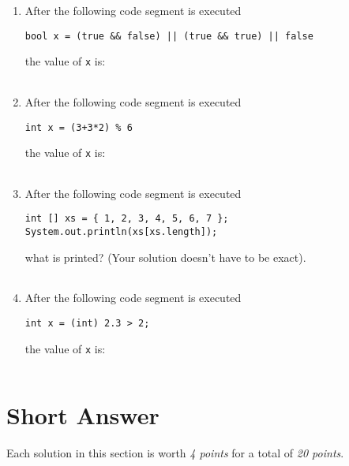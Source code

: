 \documentclass[12pt]{report}
\newcommand{\Ans}{\hfill {\Huge\begin{tabular}{|c|} \hline \hspace{2.5cm} \hfill \\ \hline \end{tabular}} }
\begin{document}
\begin{enumerate}
\item After the following code segment is executed
\begin{verbatim}
bool x = (true && false) || (true && true) || false
\end{verbatim}
the value of \texttt{x} is: \Ans

\item After the following code segment is executed
\begin{verbatim}
int x = (3+3*2) % 6
\end{verbatim}
the value of \texttt{x} is: \Ans

\item After the following code segment is executed
\begin{verbatim}
int [] xs = { 1, 2, 3, 4, 5, 6, 7 };
System.out.println(xs[xs.length]);
\end{verbatim}
what is printed? (Your solution doesn't have to be exact). \Ans

\item After the following code segment is executed
\begin{verbatim}
int x = (int) 2.3 > 2;
\end{verbatim}
the value of \texttt{x} is: \Ans

\end{enumerate}

\clearpage
\section*{Short Answer}
Each solution in this section is worth \emph{4 points} for a total of \emph{20 points}.
\end{document}
